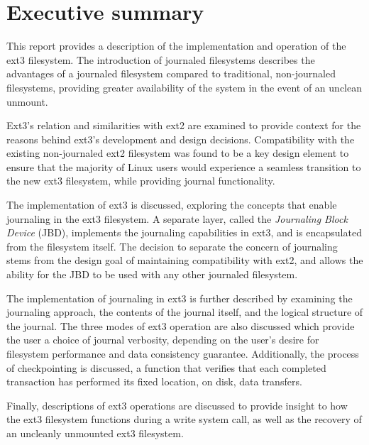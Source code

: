 \section{Executive summary}

This report provides a description of the implementation and operation of the ext3 filesystem. The introduction of journaled filesystems describes the advantages of a journaled filesystem compared to traditional, non-journaled filesystems, providing greater availability of the system in the event of an unclean unmount.

Ext3's relation and similarities with ext2 are examined to provide context for the reasons behind ext3's development and design decisions. Compatibility with the existing non-journaled ext2 filesystem was found to be a key design element to ensure that the majority of Linux users would experience a seamless transition to the new ext3 filesystem, while providing journal functionality.

The implementation of ext3 is discussed, exploring the concepts that enable journaling in the ext3 filesystem. A separate layer, called the \emph{Journaling Block Device} (JBD), implements the journaling capabilities in ext3, and is encapsulated from the filesystem itself. The decision to separate the concern of journaling stems from the design goal of maintaining compatibility with ext2, and allows the ability for the JBD to be used with any other journaled filesystem.

The implementation of journaling in ext3 is further described by examining the journaling approach, the contents of the journal itself, and the logical structure of the journal. The three modes of ext3 operation are also discussed which provide the user a choice of journal verbosity, depending on the user's desire for filesystem performance and data consistency guarantee. Additionally, the process of checkpointing is discussed, a function that verifies that each completed transaction has performed its fixed location, on disk, data transfers.

Finally, descriptions of ext3 operations are discussed to provide insight to how the ext3 filesystem functions during a write system call, as well as the recovery of an uncleanly unmounted ext3 filesystem.